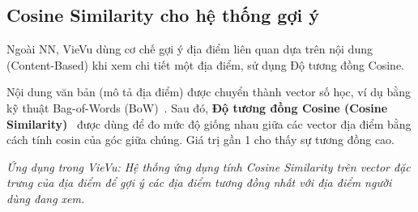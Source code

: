 \subsection{Cosine Similarity cho hệ thống gợi ý}

Ngoài NN, VieVu dùng cơ chế gợi ý địa điểm liên quan dựa trên nội dung (Content-Based) khi xem chi tiết một địa điểm, sử dụng Độ tương đồng Cosine.

Nội dung văn bản (mô tả địa điểm) được chuyển thành vector số học, ví dụ bằng kỹ thuật Bag-of-Words (BoW)~\cite{bow_concept}. Sau đó, \textbf{Độ tương đồng Cosine (Cosine Similarity)}~\cite{cosine_similarity_concept} được dùng để đo mức độ giống nhau giữa các vector địa điểm bằng cách tính cosin của góc giữa chúng. Giá trị gần 1 cho thấy sự tương đồng cao.

\textit{Ứng dụng trong VieVu: Hệ thống ứng dụng tính Cosine Similarity trên vector đặc trưng của địa điểm để gợi ý các địa điểm tương đồng nhất với địa điểm người dùng đang xem.}